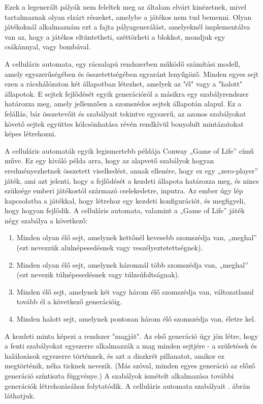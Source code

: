 Ezek a legenerált pályák nem feleltek meg az általam elvárt kinézetnek, mivel tartalmaznak olyan elzárt részeket, amelybe a játékos nem tud bemenni. Olyan játékoknál alkalmaznám ezt a fajta pályagenerálást, amelyeknél implementálva van az, hogy a játékos eltüntetheti, széttörheti a blokkot, mondjuk egy csákánnyal, vagy bombával.


A celluláris automata, egy rácsalapú rendszerben működő számítási modell, amely egyszerűségében és összetettségében egyaránt lenyűgöző. Minden egyes sejt ezen a rácshálózaton két állapotban létezhet, amelyek az "él" vagy a "halott" állapotok. E sejtek fejlődését egyik generációról a másikra egy szabályrendszer határozza meg, amely jellemzően a szomszédos sejtek állapotán alapul. Ez a felállás, bár összetevőit és szabályait tekintve egyszerű, az azonos szabályokat követő sejtek együttes kölcsönhatása révén rendkívül bonyolult mintázatokat képes létrehozni.\cite{cellular}

A celluláris automaták egyik legismertebb példája Conway „Game of Life” című műve. Ez egy kiváló példa arra, hogy az alapvető szabályok hogyan eredményezhetnek összetett viselkedést, annak ellenére, hogy ez egy „zero-player” játék, ami azt jelenti, hogy a fejlődését a kezdeti állapota határozza meg, és nincs szüksége emberi játékostól származó cselekedetre, inputra. Az ember úgy lép kapcsolatba a játékkal, hogy létrehoz egy kezdeti konfigurációt, és megfigyeli, hogy hogyan fejlődik. A celluláris automata, valamint a „Game of Life” játék négy szabálya a következő:\cite{conway}
\begin{enumerate}
\item Minden olyan élő sejt, amelynek kettőnél kevesebb szomszédja van, „meghal” (ezt nevezzük alulnépesedésnek vagy veszélyeztetettségnek).\cite{conway}
\item Minden olyan élő sejt, amelynek háromnál több szomszédja van, „meghal” (ezt nevezik túlnépesedésnek vagy túlzsúfoltságnak).\cite{conway}
\item Minden élő sejt, amelynek két vagy három élő szomszédja van, változatlanul tovább él a következő generációig.\cite{conway}
\item Minden halott sejt, amelynek pontosan három élő szomszédja van, életre kel.\cite{conway}
\end{enumerate}

A kezdeti minta képezi a rendszer "magját". Az első generáció úgy jön létre, hogy a fenti szabályokat egyszerre alkalmazzák a mag minden sejtjére - a születések és halálozások egyszerre történnek, és azt a diszkrét pillanatot, amikor ez megtörténik, néha ticknek nevezik. (Más szóval, minden egyes generáció az előző generáció színtiszta függvénye.) A szabályok ismételt alkalmazása további generációk létrehozásához folytatódik. \cite{conway} A celluláris automata szabályait . ábrán láthatjuk.

